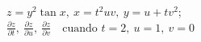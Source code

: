 \item $z = y^2 \tan x, \ x = t^2uv, \ y = u + tv^2$; \\
$\frac{\partial z}{\partial t}, \ \frac{\partial z}{\partial u}, \ \frac{\partial z}{\partial v} \quad \text{cuando } t = 2, \ u = 1, \ v = 0$

